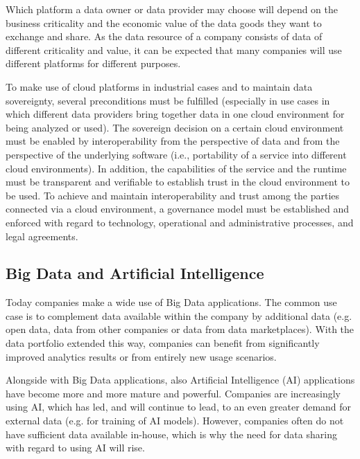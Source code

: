 Which platform a data owner or data provider may choose will depend on the business criticality and the economic value of the data goods they want to exchange and share. As the data resource of a company consists of data of different criticality and value, it can be expected that many companies will use different platforms for different purposes.



To make use of cloud platforms in industrial cases and to maintain data sovereignty, several preconditions must be fulfilled (especially in use cases in which different data providers bring together data in one cloud environment for being analyzed or used). The sovereign decision on a certain cloud environment must be enabled by interoperability from the perspective of data and from the perspective of the underlying software (i.e., portability of a service into different cloud environments). In addition, the capabilities of the service and the runtime must be transparent and verifiable to establish trust in the cloud environment to be used. To achieve and maintain interoperability and trust among the parties connected via a cloud environment, a governance model must be established and enforced with regard to technology, operational and administrative processes, and legal agreements.


\subsection{Big Data and Artificial Intelligence}\label{subsec:bigdata_ai}
Today companies make a wide use of Big Data applications. The common use case is to complement data available within the company by additional data (e.g. open data, data from other companies or data from data marketplaces). With the data portfolio extended this way, companies can benefit from significantly improved analytics results or from entirely new usage scenarios. 

Alongside with Big Data applications, also Artificial Intelligence (AI) applications have become more and more mature and powerful. Companies are increasingly using AI, which has led, and will continue to lead, to an even greater demand for external data (e.g. for training of AI models). However, companies often do not have sufficient data available in-house, which is why the need for data sharing with regard to using AI will rise.   


